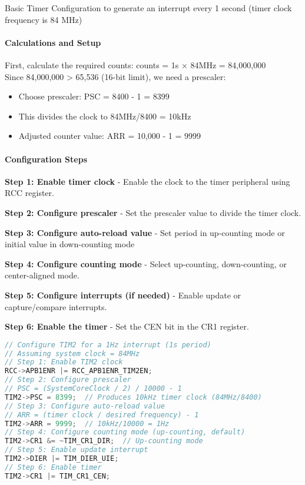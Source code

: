 \begin{KR}{Basic Timer Configuration} to generate an interrupt every 1 second (timer clock frequency is 84 MHz)
\paragraph{Calculations and Setup}
First, calculate the required counts: counts = 1s × 84MHz = 84,000,000
\vspace{1mm}\\
Since 84,000,000 > 65,536 (16-bit limit), we need a prescaler:
\begin{itemize}
    \item Choose prescaler: PSC = 8400 - 1 = 8399
    \item This divides the clock to 84MHz/8400 = 10kHz
    \item Adjusted counter value: ARR = 10,000 - 1 = 9999
\end{itemize}

\paragraph{Configuration Steps}
\textbf{Step 1: Enable timer clock} -
Enable the clock to the timer peripheral using RCC register.

\textbf{Step 2: Configure prescaler} -
Set the prescaler value to divide the timer clock.

\textbf{Step 3: Configure auto-reload value} -
Set period in up-counting mode or initial value in down-counting mode

\textbf{Step 4: Configure counting mode} -
Select up-counting, down-counting, or center-aligned mode.

\textbf{Step 5: Configure interrupts (if needed)} -
Enable update or capture/compare interrupts.

\textbf{Step 6: Enable the timer} -
Set the CEN bit in the CR1 register.

\begin{lstlisting}[language=C, style=basesmol]
// Configure TIM2 for a 1Hz interrupt (1s period)
// Assuming system clock = 84MHz
// Step 1: Enable TIM2 clock
RCC->APB1ENR |= RCC_APB1ENR_TIM2EN;
// Step 2: Configure prescaler
// PSC = (SystemCoreClock / 2) / 10000 - 1
TIM2->PSC = 8399;  // Produces 10kHz timer clock (84MHz/8400)
// Step 3: Configure auto-reload value
// ARR = (timer clock / desired frequency) - 1
TIM2->ARR = 9999;  // 10kHz/10000 = 1Hz
// Step 4: Configure counting mode (up-counting, default)
TIM2->CR1 &= ~TIM_CR1_DIR;  // Up-counting mode
// Step 5: Enable update interrupt
TIM2->DIER |= TIM_DIER_UIE;
// Step 6: Enable timer
TIM2->CR1 |= TIM_CR1_CEN;


\end{lstlisting}
\end{KR}
